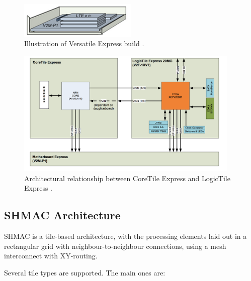 \begin{figure}[htb]
    \centering
    \includegraphics[width=0.5\textwidth]{Figures/VersatileExpress/VexpressTiles}
    \caption{Illustration of Versatile Express build \cite{VexpressHomepage}.}
    \label{fig:vexpressTiles}
\end{figure}

\begin{figure}[htb]
    \centering
    \includegraphics[width=0.95\textwidth]{Figures/VersatileExpress/OurTiles}
    \caption{Architectural relationship between CoreTile Express and LogicTile Express \cite{LogicTileDataSheet}.}
    \label{fig:logicTile}
\end{figure}

\subsection{SHMAC Architecture}

SHMAC is a tile-based architecture, with the processing elements laid out in a rectangular
grid with neighbour-to-neighbour connections, using a mesh interconnect with XY-routing.

Several tile types are supported. The main ones are:


